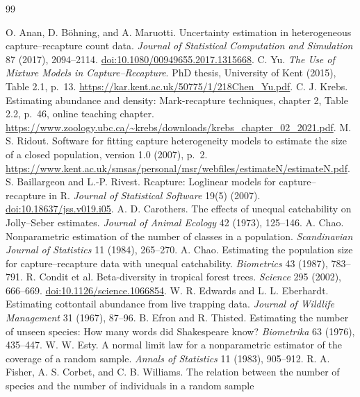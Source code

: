 \documentclass[11pt]{article}
\theoremstyle{remark}\newtheorem{remark}[theorem]{Remark}
\begin{document}
\clearpage
\begin{thebibliography}{99}\small\raggedright
{} O. Anan, D. B\"ohning, and A. Maruotti. Uncertainty
estimation in heterogeneous capture--recapture count data.
\emph{Journal of Statistical Computation and Simulation} 87 (2017), 2094--2114.
\href{https://doi.org/10.1080/00949655.2017.1315668}{doi:10.1080/00949655.2017.1315668}.
 C. Yu. \emph{The Use of Mixture Models in Capture--Recapture}.
PhD thesis, University of Kent (2015), Table 2.1, p.~13.
\url{https://kar.kent.ac.uk/50775/1/218Chen_Yu.pdf}.
 C. J. Krebs. Estimating abundance and density: Mark-recapture
techniques, chapter 2, Table 2.2, p.~46, online teaching chapter.
\url{https://www.zoology.ubc.ca/~krebs/downloads/krebs_chapter_02_2021.pdf}.
 M. S. Ridout. Software for fitting capture heterogeneity
models to estimate the size of a closed population, version 1.0 (2007), p.~2.
\url{https://www.kent.ac.uk/smsas/personal/msr/webfiles/estimateN/estimateN.pdf}.
 S. Baillargeon and L.-P. Rivest.
Rcapture: Loglinear models for capture--recapture in R.
\emph{Journal of Statistical Software} 19(5) (2007).
\href{https://doi.org/10.18637/jss.v019.i05}{doi:10.18637/jss.v019.i05}.
 A. D. Carothers. The effects of unequal catchability on
Jolly--Seber estimates. \emph{Journal of Animal Ecology} 42 (1973), 125--146.
 A. Chao. Nonparametric estimation of the number of classes
in a population. \emph{Scandinavian Journal of Statistics} 11 (1984), 265--270.
 A. Chao. Estimating the population size for capture--recapture
data with unequal catchability. \emph{Biometrics} 43 (1987), 783--791.
 R. Condit et al. Beta-diversity in tropical forest trees.
\emph{Science} 295 (2002), 666--669.
\href{https://doi.org/10.1126/science.1066854}{doi:10.1126/science.1066854}.
 W. R. Edwards and L. L. Eberhardt. Estimating cottontail
abundance from live trapping data. \emph{Journal of Wildlife Management} 31
(1967), 87--96.
 B. Efron and R. Thisted. Estimating the number of
unseen species: How many words did Shakespeare know? \emph{Biometrika} 63
(1976), 435--447.
 W. W. Esty. A normal limit law for a nonparametric estimator
of the coverage of a random sample. \emph{Annals of Statistics} 11 (1983), 905--912.
 R. A. Fisher, A. S. Corbet, and C. B. Williams. The relation
between the number of species and the number of individuals in a random sample

\end{thebibliography}
\end{document}

